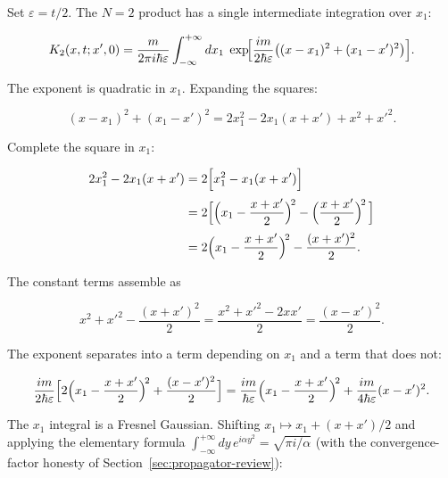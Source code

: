 Set $\varepsilon = t/2$. The $N = 2$ product has a single intermediate integration over $x_1$:
\begin{linenomath}
\begin{equation*}
K_2(x,t;x',0) = \frac{m}{2\pi i\hbar\varepsilon}
\int_{-\infty}^{+\infty} dx_1\;
\exp\!\Bigl[\frac{im}{2\hbar\varepsilon}
\bigl((x-x_1)^2 + (x_1-x')^2\bigr)\Bigr] .
\end{equation*}
\end{linenomath}
The exponent is quadratic in $x_1$. Expanding the squares:
\begin{linenomath}
\begin{equation*}
(x-x_1)^2 + (x_1-x')^2
= 2x_1^2 - 2x_1(x+x') + x^2 + x'^2 .
\end{equation*}
\end{linenomath}
Complete the square in $x_1$:
\begin{linenomath}
\begin{equation*}
\begin{aligned}
2x_1^2 - 2x_1(x+x')
&= 2\Bigl[x_1^2 - x_1(x+x')\Bigr] \\[2pt]
&= 2\Bigl[\Bigl(x_1 - \frac{x+x'}{2}\Bigr)^{\!2}
   - \Bigl(\frac{x+x'}{2}\Bigr)^{\!2}\,\Bigr] \\[2pt]
&= 2\Bigl(x_1 - \frac{x+x'}{2}\Bigr)^{\!2}
   - \frac{(x+x')^2}{2} .
\end{aligned}
\end{equation*}
\end{linenomath}
The constant terms assemble as
\begin{linenomath}
\begin{equation*}
x^2 + x'^2 - \frac{(x+x')^2}{2}
= \frac{x^2 + x'^2 - 2xx'}{2}
= \frac{(x-x')^2}{2} .
\end{equation*}
\end{linenomath}
The exponent separates into a term depending on $x_1$ and a term that does not:
\begin{linenomath}
\begin{equation*}
\frac{im}{2\hbar\varepsilon}\Bigl[
2\Bigl(x_1 - \frac{x+x'}{2}\Bigr)^{\!2}
+ \frac{(x-x')^2}{2}\Bigr]
= \frac{im}{\hbar\varepsilon}\Bigl(x_1 - \frac{x+x'}{2}\Bigr)^{\!2}
+ \frac{im}{4\hbar\varepsilon}(x-x')^2 .
\end{equation*}
\end{linenomath}
The $x_1$ integral is a Fresnel Gaussian. Shifting $x_1 \mapsto x_1 + (x+x')/2$ and applying the elementary formula $\int_{-\infty}^{+\infty} dy\, e^{i\alpha y^2} = \sqrt{\pi i/\alpha}$ (with the convergence-factor honesty of Section~\ref{sec:propagator-review}):
